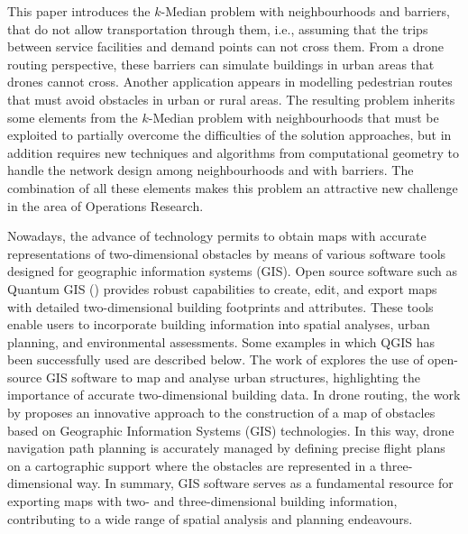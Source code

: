 \documentclass[a4paper,  review, authoryear, 1p.]{elsarticle}
\begin{document}
	This paper introduces the $k$-Median problem with neighbourhoods and barriers, that do not allow transportation through them, i.e., assuming that the trips between service facilities and demand points can not cross them. From a drone routing perspective, these barriers can simulate buildings in urban areas that drones cannot cross. Another application appears in modelling  pedestrian routes that  must avoid obstacles in urban or rural areas. The resulting problem inherits some elements from the $k$-Median problem with neighbourhoods that must be exploited to partially overcome the difficulties of the solution approaches, but in addition requires new techniques and algorithms  from computational geometry to handle the network design among neighbourhoods and with barriers. The combination of all these elements makes this problem an attractive new challenge in the area of Operations Research. 
	
		
	Nowadays, the advance of technology permits to obtain maps with accurate representations of two-dimensional obstacles by means of various software tools designed for geographic information systems (GIS). Open source software such as Quantum GIS (\cite{qgisdevelopmentteam2009}) provides robust capabilities to create, edit, and export maps with detailed two-dimensional building footprints and attributes. These tools enable users to incorporate building information into spatial analyses, urban planning, and environmental assessments. Some examples in which QGIS has been successfully used are described below. The work of \cite{arsanjani2013} explores the use of open-source GIS software to map and analyse urban structures, highlighting the importance of accurate two-dimensional building data. In drone routing, the work by \cite{mangiameli2013} proposes an innovative approach to the construction of a map of obstacles based on Geographic Information Systems (GIS) technologies. In this way, drone navigation path planning is accurately managed by defining precise flight plans on a cartographic support where the obstacles are represented in a three-dimensional way. In summary, GIS software serves as a fundamental resource for exporting maps with two- and three-dimensional building information, contributing to a wide range of spatial analysis and planning endeavours.
		
\end{document}
